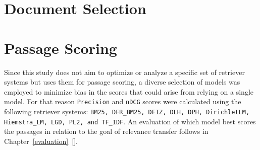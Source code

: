 \section{Document Selection}\label{eval-doucment-selection}

\section{Passage Scoring}\label{eval-passage-scoring}

Since this study does not aim to optimize or analyze a specific set of retriever systems but uses them for passage scoring, a diverse selection of models was employed to minimize bias in the scores that could arise from relying on a single model. For that reason \texttt{Precision} and \texttt{nDCG} scores were calculated using the following retriever systems: \texttt{BM25, DFR\_BM25, DFIZ, DLH, DPH, DirichletLM, Hiemstra\_LM, LGD, PL2, and TF\_IDF}. An evaluation of which model best scores the passages in relation to the goal of relevance transfer follows in Chapter~\ref{evaluation}~[].

